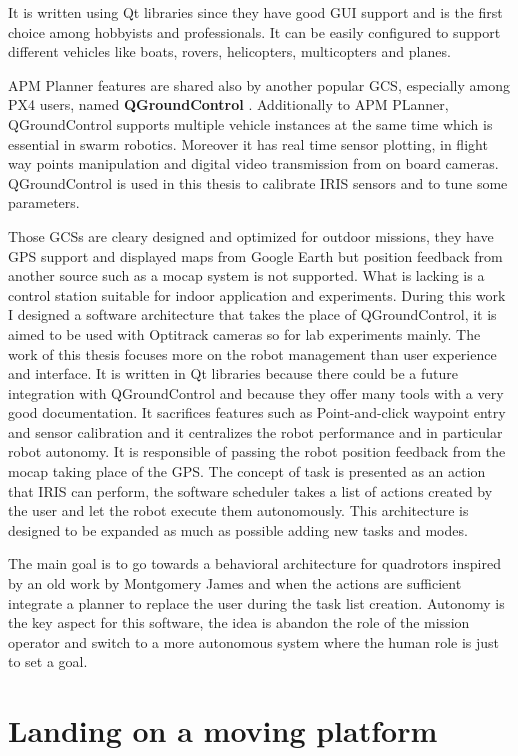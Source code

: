 It is written using Qt libraries since they have good GUI support and is the first choice among hobbyists and professionals. It can be easily configured to  support different vehicles like boats, rovers, helicopters, multicopters and planes. \par APM Planner features are shared also by another popular GCS, especially among PX4 users, named \textbf{QGroundControl} \cite{QGround}. Additionally to APM PLanner, QGroundControl supports multiple vehicle instances at the same time which is essential in swarm robotics.  Moreover it has real time sensor plotting, in flight way points manipulation and digital video transmission from on board cameras. QGroundControl is used in this thesis to calibrate IRIS sensors and to tune some parameters. \par Those GCSs are cleary designed and optimized for outdoor missions, they have GPS support and displayed maps from Google Earth but position feedback from another source such as a mocap system is not supported. What is lacking is a control station suitable for indoor application and experiments. During this work I designed a software architecture that takes the place of QGroundControl, it is aimed to be used with Optitrack cameras so for lab experiments mainly. The work of this thesis focuses more on the robot management than user experience and interface. It is written in Qt libraries because there could be a future integration with QGroundControl and because they offer many tools with a very good documentation. It sacrifices features such as Point-and-click waypoint entry and sensor calibration and it centralizes the robot performance and in particular robot autonomy. It is responsible of passing the robot position feedback from the mocap taking place of the GPS. The concept of task is presented as an action that IRIS can perform, the software scheduler takes a list of actions created by the user and let the robot execute them autonomously. This architecture is designed to be expanded as much as possible adding new tasks and modes.\par The main goal is to go towards a behavioral architecture for quadrotors inspired by an old work by Montgomery James \cite{Montgomery1995} and when the actions are sufficient integrate a planner to replace the user during the task list creation. Autonomy is the key aspect for this software, the idea is abandon the role of the mission operator and switch to a more autonomous system where the human role is just to set a goal.

\section{Landing on a moving platform}

